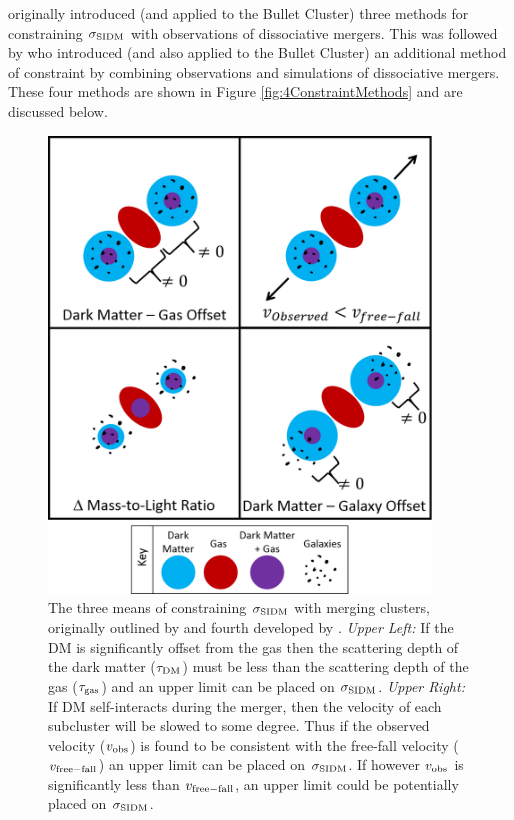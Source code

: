 \citet{Markevitch:2004dl} originally introduced (and applied to the Bullet Cluster) three methods for constraining $\sigma_{\rm SIDM}$ with observations of dissociative mergers.
This was followed by \citet{Randall:2008hs} who introduced (and also applied to the Bullet Cluster) an additional method of constraint by combining observations and simulations of dissociative mergers.
These four methods are shown in Figure \ref{fig:4ConstraintMethods} and are discussed below.

\begin{figure}
\centering
\includegraphics[width=4in]{Chapter1/4ConstraintMethods.png}
\caption[The four means of constraining $\sigma_{\rm SIDM}$ with merging clusters.]{The three means of constraining $\sigma_{\rm SIDM}$ with merging clusters, originally outlined by \citet{Markevitch:2004dl} and fourth developed by \citet{Randall:2008hs}. 
\emph{Upper Left:} If the DM is significantly offset from the gas then the scattering depth of the dark matter ($\tau_{\rm DM}$) must be less than the scattering depth of the gas ($\tau_{\rm gas}$) and an upper limit can be placed on $\sigma_{\rm SIDM}$.
\emph{Upper Right:} If DM self-interacts during the merger, then the velocity of each subcluster will be slowed to some degree.
Thus if the observed velocity ($v_{\rm obs}$) is found to be consistent with the free-fall velocity ($v_{\rm free-fall}$) an upper limit can be placed on $\sigma_{\rm SIDM}$.
If however $v_{\rm obs}$ is significantly less than $v_{\rm free-fall}$, an upper limit could be potentially placed on $\sigma_{\rm SIDM}$.
}
\end{figure}
